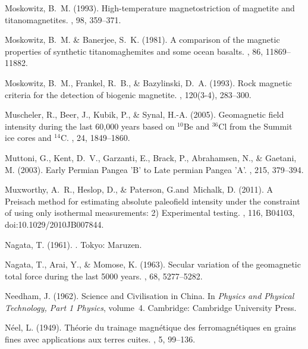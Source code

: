 Moskowitz, B.~M. (1993).
\newblock High-temperature magnetostriction of magnetite and titanomagnetites.
, 98, 359--371.

Moskowitz, B.~M. \& Banerjee, S.~K. (1981).
\newblock A comparison of the magnetic properties of synthetic titanomaghemites
  and some ocean basalts.
, 86, 11869--11882.

Moskowitz, B.~M., Frankel, R.~B., \& Bazylinski, D.~A. (1993).
\newblock Rock magnetic criteria for the detection of biogenic magnetite.
, 120(3-4), 283--300.

Muscheler, R., Beer, J., Kubik, P., \& Synal, H.-A. (2005).
\newblock Geomagnetic field intensity during the last 60,000 years based on
  $^{10}$Be and $^{36}$Cl from the Summit ice cores and $^{14}$C.
, 24, 1849--1860.

Muttoni, G., Kent, D.~V., Garzanti, E., Brack, P., Abrahamsen, N., \& Gaetani,
  M. (2003).
\newblock Early Permian Pangea 'B' to Late permian Pangea 'A'.
, 215, 379--394.

Muxworthy, A.~R., Heslop, D., \& Paterson, G.and~Michalk, D. (2011).
\newblock A Preisach method for estimating absolute paleofield intensity under
  the constraint of using only isothermal measurements: 2) Experimental
  testing.
, 116, B04103, doi:10.1029/2010JB007844.

Nagata, T. (1961).
.
\newblock Tokyo: Maruzen.

Nagata, T., Arai, Y., \& Momose, K. (1963).
\newblock Secular variation of the geomagnetic total force during the last 5000
  years.
, 68, 5277--5282.

Needham, J. (1962).
\newblock Science and Civilisation in China.
\newblock In {\em Physics and Physical Technology, Part 1 Physics}, volume~4.
  Cambridge: Cambridge University Press.

N\'eel, L. (1949).
\newblock Th\' eorie du trainage magn\' etique des ferromagn\' etiques en
  grains fines avec applications aux terres cuites.
, 5, 99--136.

